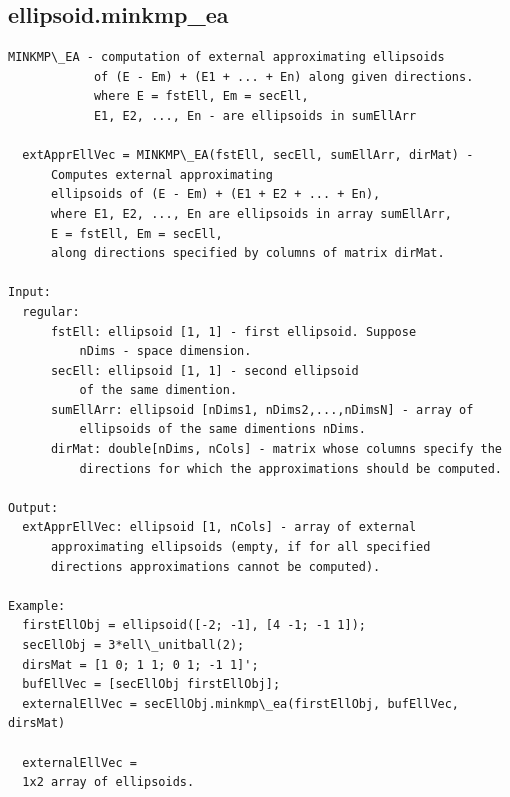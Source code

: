 \documentclass[letterpaper,10pt,english]{sphinxmanual}
\begin{document}
\subsection{ellipsoid.minkmp\_ea}
\label{chap_functions:ellipsoid-minkmp-ea}
\begin{Verbatim}[commandchars=\\\{\}]
MINKMP\_EA - computation of external approximating ellipsoids
            of (E - Em) + (E1 + ... + En) along given directions.
            where E = fstEll, Em = secEll,
            E1, E2, ..., En - are ellipsoids in sumEllArr

  extApprEllVec = MINKMP\_EA(fstEll, secEll, sumEllArr, dirMat) -
      Computes external approximating
      ellipsoids of (E - Em) + (E1 + E2 + ... + En),
      where E1, E2, ..., En are ellipsoids in array sumEllArr,
      E = fstEll, Em = secEll,
      along directions specified by columns of matrix dirMat.

Input:
  regular:
      fstEll: ellipsoid [1, 1] - first ellipsoid. Suppose
          nDims - space dimension.
      secEll: ellipsoid [1, 1] - second ellipsoid
          of the same dimention.
      sumEllArr: ellipsoid [nDims1, nDims2,...,nDimsN] - array of
          ellipsoids of the same dimentions nDims.
      dirMat: double[nDims, nCols] - matrix whose columns specify the
          directions for which the approximations should be computed.

Output:
  extApprEllVec: ellipsoid [1, nCols] - array of external
      approximating ellipsoids (empty, if for all specified
      directions approximations cannot be computed).

Example:
  firstEllObj = ellipsoid([-2; -1], [4 -1; -1 1]);
  secEllObj = 3*ell\_unitball(2);
  dirsMat = [1 0; 1 1; 0 1; -1 1]';
  bufEllVec = [secEllObj firstEllObj];
  externalEllVec = secEllObj.minkmp\_ea(firstEllObj, bufEllVec, dirsMat)

  externalEllVec =
  1x2 array of ellipsoids.
\end{Verbatim}
\end{document}
